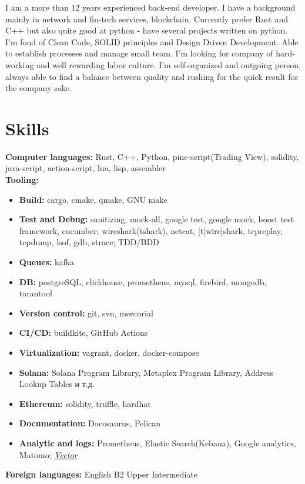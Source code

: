 \documentclass[letterpaper,11pt]{article}
\newcommand{\resumeSubHeadingListStart}{\begin{itemize}[leftmargin=0.15in, label={}]}
\newcommand{\resumeSubHeadingListEnd}{\end{itemize}}
\begin{document}
I am a more than 12 years experienced back-end developer. I have a background mainly in  network and fin-tech services, blockchain. Currently prefer Rust and C++ but also quite good at python - have several projects written on python. I'm fond of Clean Code, SOLID principles and Design Driven Development.
Able to establish processes and manage small team. I'm looking for company of hard-working and well rewarding labor culture. I'm self-organized and outgoing person, always able to find a balance between quality and rushing for the quick result for the company sake.


\section{Skills}
  \vspace{3pt}
  \resumeSubHeadingListStart
    \small{\item{
        \textbf{Computer languages:}{ Rust, C++, Python, pine-script(Trading View), solidity, java-script, action-script, lua, lisp, assembler } \\
        \textbf{Tooling: }\begin{itemize}[topsep=0pt,itemsep=0.1pt]
            \item\textbf{Build: }{ cargo, cmake, qmake, GNU make}
            \item\textbf{Test and Debug: }{ sanitizing, mock-all, google test, google mock, boost test framework, cucumber; wireshark(tshark), netcat, [t|wire]shark, tcpreplay, tcpdump, lsof, gdb, strace; TDD/BDD }
            \item\textbf{Queues: }{kafka }
            \item\textbf{DB: }{postgreSQL, clickhouse, prometheus, mysql, firebird, mongodb, tarantool }
            \item\textbf{Version control: }{git, svn, mercurial}
            \item\textbf{CI/CD: }{buildkite, GitHub Actions}
            \item\textbf{Virtualization: }{vagrant, docker, docker-compose}
            \item\textbf{Solana: }{Solana Program Library, Metaplex Program Library, Address Lookup Tables и т.д.}
            \item\textbf{Ethereum: }{solidity, truffle, hardhat}
            \item\textbf{Documentation: }{ Docosaurus, Pelican }
            \item\textbf{Analytic and logs: }{ Prometheus, Elastic Search(Kebana), Google analytics, Matomo; \emph{\href{https://vector.dev/}{\color{blue}Vector}} }
        \end{itemize}
        \textbf{Foreign languages:}{ English B2 Upper Intermediate } 
    }}
  \resumeSubHeadingListEnd
\end{document}
